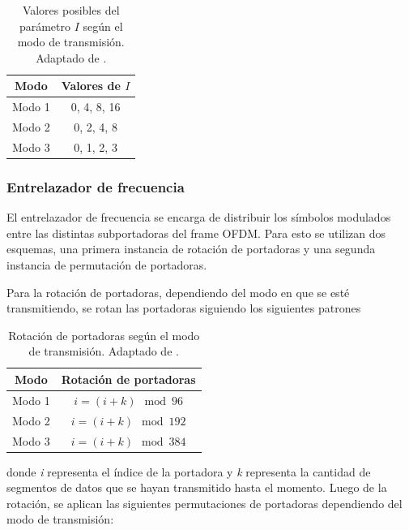 
	\begin{table}[h]
		\centering

		\renewcommand{\arraystretch}{1.2} %
		\begin{tabular}{|c c|}
			\hline
			\textbf{Modo} & \textbf{Valores de $I$} \\
			\hline\hline
			Modo 1 & 0, 4, 8, 16 \\
			Modo 2 & 0, 2, 4, 8 \\
			Modo 3 & 0, 1, 2, 3 \\
			\hline
		\end{tabular}
		\caption{Valores posibles del parámetro $I$ según el modo de transmisión. Adaptado de \cite{isdbt}.}
		\label{tab:parametro_I}
	\end{table}

	\subsubsection{Entrelazador de frecuencia}
	El entrelazador de frecuencia se encarga de distribuir los símbolos modulados entre las distintas subportadoras del frame OFDM. Para esto se utilizan dos esquemas, una primera instancia de rotación de portadoras y una segunda instancia de permutación de portadoras.

	Para la rotación de portadoras, dependiendo del modo en que se esté transmitiendo, se rotan las portadoras siguiendo los siguientes patrones
	\begin{table}[H]
		\centering
		\begin{tabular}{|c c|}
			\hline
			\textbf{Modo} & \textbf{Rotación de portadoras} \\
			\hline\hline
			Modo 1 & $i = (i + k) \mod 96$ \\
			Modo 2 & $i = (i + k) \mod 192$ \\
			Modo 3 & $i = (i + k) \mod 384$ \\
			\hline
		\end{tabular}
		\caption{Rotación de portadoras según el modo de transmisión. Adaptado de \cite{isdbt}.}
		\label{tab:rotacion_portadoras}
	\end{table}

	donde \textit{i} representa el índice de la portadora y \textit{k} representa la cantidad de segmentos de datos que se hayan transmitido hasta el momento. Luego de la rotación, se aplican las siguientes permutaciones de portadoras dependiendo del modo de transmisión:

